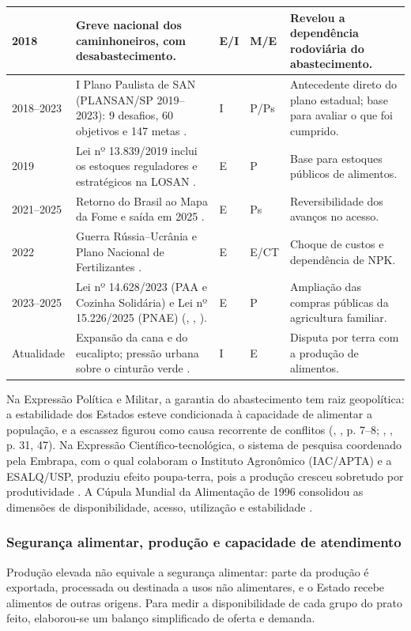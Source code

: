 \documentclass[
	12pt,				%
	openright,			%
	oneside,			%
	a4paper,			%
	chapter=TITLE,		%
	section=TITLE,		%
	english,			%
	french,				%
	spanish,			%
	brazil,				%
 ]{abntex2}
\begin{document}
\begin{quadro}[!htbp]
\begin{tabularx}{\textwidth}{|p{1.65cm}|>{\raggedright\arraybackslash}X|>{\centering\arraybackslash}p{0.9cm}|>{\centering\arraybackslash}p{0.9cm}|>{\raggedright\arraybackslash}p{5.2cm}|}
\hline
2018 & Greve nacional dos caminhoneiros, com desabastecimento. & E/I & M/E & Revelou a dependência rodoviária do abastecimento. \\
\hline
2018--2023 & I Plano Paulista de SAN (PLANSAN/SP 2019--2023): 9 desafios, 60 objetivos e 147 metas \cite{saopaulo2018plansan}. & I & P/Ps & Antecedente direto do plano estadual; base para avaliar o que foi cumprido. \\
\hline
2019 & Lei nº 13.839/2019 inclui os estoques reguladores e estratégicos na LOSAN \cite{brasil2019estoques}. & E & P & Base para estoques públicos de alimentos. \\
\hline
2021--2025 & Retorno do Brasil ao Mapa da Fome e saída em 2025 \cite{fao_sofi2025}. & E & Ps & Reversibilidade dos avanços no acesso. \\
\hline
2022 & Guerra Rússia--Ucrânia e Plano Nacional de Fertilizantes \cite{fao2022ukraine,brasil2022fertilizantes}. & E & E/CT & Choque de custos e dependência de NPK. \\
\hline
2023--2025 & Lei nº 14.628/2023 (PAA e Cozinha Solidária) e Lei nº 15.226/2025 (PNAE) (\citeauthor{brasil2023paa}, \citeyear{brasil2023paa}, \citeyear{brasil2025pnae}). & E & P & Ampliação das compras públicas da agricultura familiar. \\
\hline
Atualidade & Expansão da cana e do eucalipto; pressão urbana sobre o cinturão verde \cite{iea_sp_2023}. & I & E & Disputa por terra com a produção de alimentos. \\
\hline
\end{tabularx}
\end{quadro}

Na Expressão Política e Militar, a garantia do abastecimento tem raiz
geopolítica: a estabilidade dos Estados esteve condicionada à capacidade de
alimentar a população, e a escassez figurou como causa recorrente de conflitos
(\citeauthor{bertolini2022}, \citeyear{bertolini2022}, p. 7--8; \citeauthor{perez2018}, \citeyear{perez2018}, p. 31, 47). Na
Expressão Científico-tecnológica, o sistema de pesquisa coordenado pela Embrapa,
com o qual colaboram o Instituto Agronômico (IAC/APTA) e a ESALQ/USP, produziu
efeito poupa-terra, pois a produção cresceu sobretudo por produtividade
\cite[p. 25]{perez2018}. A Cúpula Mundial da Alimentação de 1996 consolidou as
dimensões de disponibilidade, acesso, utilização e estabilidade
\cite{fao1996}.

\subsubsection{Segurança alimentar, produção e capacidade de atendimento}
Produção elevada não equivale a segurança alimentar: parte da produção é
exportada, processada ou destinada a usos não alimentares, e o Estado recebe
alimentos de outras origens. Para medir a disponibilidade de cada grupo do prato
feito, elaborou-se um balanço simplificado de oferta e demanda.
\end{document}
